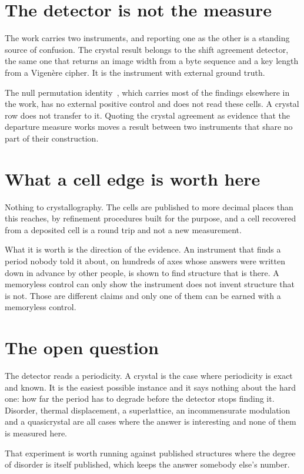 \section{The detector is not the measure}

The work carries two instruments, and reporting one as the other is a standing source of confusion. The crystal result belongs to the shift agreement detector, the same one that returns an image width from a byte sequence and a key length from a Vigenère cipher. It is the instrument with external ground truth.

The null permutation identity~\cite{src:Quigg-orior-workbook}, which carries most of the findings elsewhere in the work, has no external positive control and does not read these cells. A crystal row does not transfer to it. Quoting the crystal agreement as evidence that the departure measure works moves a result between two instruments that share no part of their construction.

\section{What a cell edge is worth here}

Nothing to crystallography. The cells are published to more decimal places than this reaches, by refinement procedures built for the purpose, and a cell recovered from a deposited cell is a round trip and not a new measurement.

What it is worth is the direction of the evidence. An instrument that finds a period nobody told it about, on hundreds of axes whose answers were written down in advance by other people, is shown to find structure that is there. A memoryless control can only show the instrument does not invent structure that is not. Those are different claims and only one of them can be earned with a memoryless control.

\section{The open question}

The detector reads a periodicity. A crystal is the case where periodicity is exact and known. It is the easiest possible instance and it says nothing about the hard one: how far the period has to degrade before the detector stops finding it. Disorder, thermal displacement, a superlattice, an incommensurate modulation and a quasicrystal are all cases where the answer is interesting and none of them is measured here.

That experiment is worth running against published structures where the degree of disorder is itself published, which keeps the answer somebody else's number.
